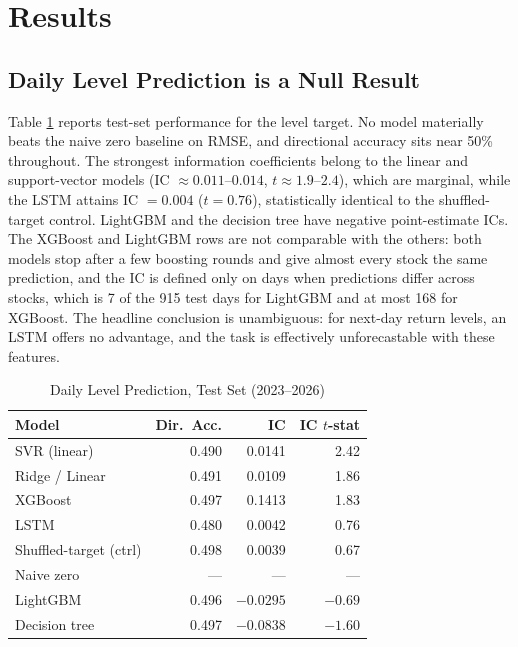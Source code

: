 \documentclass[conference]{IEEEtran}
\begin{document}
\section{Results}

\subsection{Daily Level Prediction is a Null Result}
Table \ref{tab:horserace} reports test-set performance for the level target. No
model materially beats the naive zero baseline on RMSE, and directional accuracy
sits near 50\% throughout. The strongest information coefficients belong to the
linear and support-vector models (IC $\approx 0.011$--$0.014$, $t\approx1.9$--$2.4$),
which are marginal, while the LSTM attains IC $=0.004$ ($t=0.76$), statistically
identical to the shuffled-target control. LightGBM and the decision tree have negative point-estimate ICs. The XGBoost and LightGBM rows are not comparable with the others: both models stop after a few boosting rounds and give almost every stock the same prediction, and the IC is defined only on days when predictions differ across stocks, which is 7 of the 915 test days for LightGBM and at most 168 for XGBoost. The headline conclusion is unambiguous: for
next-day return levels, an LSTM offers no advantage, and the task is effectively
unforecastable with these features.

\begin{table}[t]
\caption{Daily Level Prediction, Test Set (2023--2026)}
\label{tab:horserace}
\centering
\small
\begin{tabular}{@{}lrrr@{}}
\toprule
Model & Dir.\ Acc. & IC & IC $t$-stat \\
\midrule
SVR (linear)          & 0.490 & 0.0141 & 2.42 \\
Ridge / Linear        & 0.491 & 0.0109 & 1.86 \\
XGBoost               & 0.497 & 0.1413 & 1.83 \\
LSTM                  & 0.480 & 0.0042 & 0.76 \\
Shuffled-target (ctrl)& 0.498 & 0.0039 & 0.67 \\
Naive zero            & ---   & ---    & ---  \\
LightGBM              & 0.496 & $-0.0295$ & $-0.69$ \\
Decision tree         & 0.497 & $-0.0838$ & $-1.60$ \\
\bottomrule
\end{tabular}
\end{table}
\end{document}
